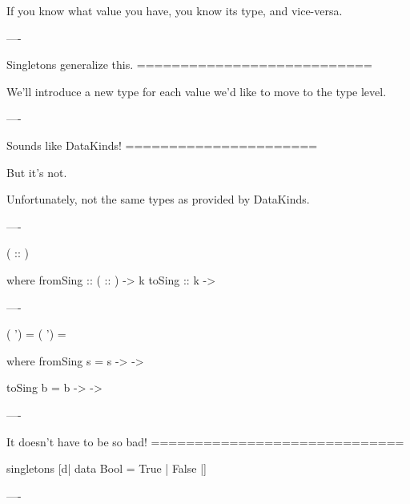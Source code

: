 If you know what value you have, you know its type, and vice-versa.

----

Singletons generalize this.
===========================

We'll introduce a new type for each value we'd like to move to the type level.

----

Sounds like DataKinds!
======================

But it's not.

Unfortunately, not the same types as provided by DataKinds.

----

\begin{custom}

    ( :: )

     where
    fromSing ::  ( :: ) -> k
    toSing   :: k ->  
\end{custom}

----

\begin{custom}
   ( ')  = 
   ( ') = 


     where
    fromSing s =  s 
        -> 
       -> 

    toSing b =  b 
        -> 
       -> 
\end{custom}

----

It doesn't have to be so bad!
=============================

\begin{hs}
  singletons [d|
    data Bool = True
              | False
    |]
\end{hs}

----

\newcommand{\singhead}{<thead>\sing{Value}{Type}{Singleton}{Singleton Type}{Existential Type}</thead>}
\newcommand{\sing}[5]{<tr><td>#1</td><td>#2</td><td>#3</td><td>#4</td><td>#5</td></tr>}
\newcommand{\singb}[2]{\sing{\b{\syn{kt}{#1}}}{\b{\syn{kt}{#2}}}{\b{\syn{kt}{S#1}}}{\b{Sing '\type{#1}}}{\b{SomeSing \kind{#2}}}}

